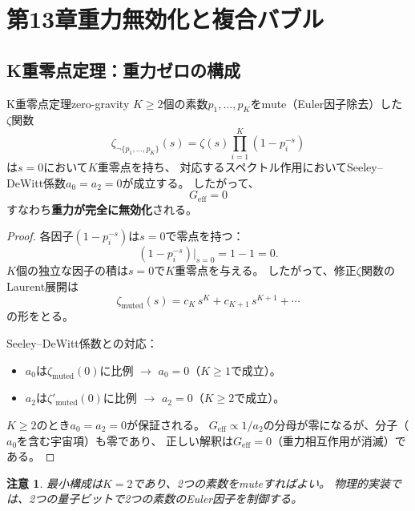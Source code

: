 \documentclass[11pt,a4paper]{article}
\newtheorem{remark}[theorem]{注意}
\newcommand{\Geff}{G_{\mathrm{eff}}}
\begin{document}

\section{第13章\quad 重力無効化と複合バブル}
\label{ch:gravity-nullification}

\subsection{K重零点定理：重力ゼロの構成}
\label{sec:13.1}

\begin{keytheorem}{K重零点定理}{zero-gravity}
$K \geq 2$個の素数$p_1, \ldots, p_K$をmute（Euler因子除去）した
$\zeta$関数
\[
\zeta_{\neg\{p_1,\ldots,p_K\}}(s) = \zeta(s) \prod_{i=1}^{K} (1 - p_i^{-s})
\]
は$s = 0$において$K$重零点を持ち、
対応するスペクトル作用においてSeeley--DeWitt係数$a_0 = a_2 = 0$が成立する。
したがって、
\[
\boxed{\Geff = 0}
\]
すなわち\textbf{重力が完全に無効化}される。
\end{keytheorem}

\begin{proof}
各因子$(1 - p_i^{-s})$は$s = 0$で零点を持つ：
\[
(1 - p_i^{-s})\big|_{s=0} = 1 - 1 = 0.
\]
$K$個の独立な因子の積は$s=0$で$K$重零点を与える。
したがって、修正$\zeta$関数のLaurent展開は
\[
\zeta_{\text{muted}}(s) = c_K \, s^K + c_{K+1} \, s^{K+1} + \cdots
\]
の形をとる。

Seeley--DeWitt係数との対応：
\begin{itemize}
\item $a_0$は$\zeta_{\text{muted}}(0)$に比例 $\longrightarrow$ $a_0 = 0$（$K \geq 1$で成立）。
\item $a_2$は$\zeta'_{\text{muted}}(0)$に比例 $\longrightarrow$ $a_2 = 0$（$K \geq 2$で成立）。
\end{itemize}
$K \geq 2$のとき$a_0 = a_2 = 0$が保証される。
$\Geff \propto 1/a_2$の分母が零になるが、分子（$a_0$を含む宇宙項）も零であり、
正しい解釈は$\Geff = 0$（重力相互作用が消滅）である。\qedhere
\end{proof}

\begin{remark}
最小構成は$K = 2$であり、2つの素数をmuteすればよい。
物理的実装では、2つの量子ビットで2つの素数のEuler因子を制御する。
\end{remark}
\end{document}
